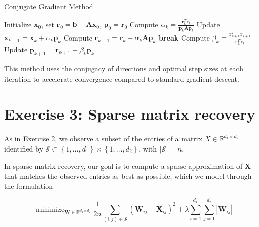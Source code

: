 \documentclass[12pt]{article}
\begin{document}
    \begin{algorithm}
        \caption{Conjugate Gradient Method}
        \begin{algorithmic}[1]
            \State Initialize \(\boldsymbol{x}_0\), set \(\boldsymbol{r}_0 = \boldsymbol{b} - \boldsymbol{A} \boldsymbol{x}_0\), \(\boldsymbol{p}_0 = \boldsymbol{r}_0\)
                \State Compute \(\alpha_k = \frac{\boldsymbol{r}_k^T \boldsymbol{r}_k}{\boldsymbol{p}_k^T \boldsymbol{A} \boldsymbol{p}_k}\)
                \State Update \(\boldsymbol{x}_{k+1} = \boldsymbol{x}_k + \alpha_k \boldsymbol{p}_k\)
                \State Compute \(\boldsymbol{r}_{k+1} = \boldsymbol{r}_k - \alpha_k \boldsymbol{A} \boldsymbol{p}_k\)
                    \State \textbf{break}
                \EndIf
                \State Compute \(\beta_k = \frac{\boldsymbol{r}_{k+1}^T \boldsymbol{r}_{k+1}}{\boldsymbol{r}_k^T \boldsymbol{r}_k}\)
                \State Update \(\boldsymbol{p}_{k+1} = \boldsymbol{r}_{k+1} + \beta_k \boldsymbol{p}_k\)
            \EndFor
        \end{algorithmic}
    \end{algorithm}

    This method uses the conjugacy of directions and optimal step sizes at each iteration to accelerate convergence compared to standard gradient descent.

    \section*{Exercise 3: Sparse matrix recovery}
    As in Exercise 2, we observe a subset of the entries of a matrix $X \in \mathbb{R}^{d_{1} \times d_{2}}$ identified by $\mathcal{S} \subset\left\{1, \ldots, d_{1}\right\} \times\left\{1, \ldots, d_{2}\right\}$, with $|\mathcal{S}|=n$.

    In sparse matrix recovery, our goal is to compute a sparse approximation of $\boldsymbol{X}$ that matches the observed entries as best as possible, which we model through the formulation

    \begin{equation}
        \operatorname{minimize}_{\boldsymbol{W} \in \mathbb{R}^{d_{1} \times d_{2}}} \frac{1}{2 n} \sum_{(i, j) \in \mathcal{S}}\left(\boldsymbol{W}_{i j}-\boldsymbol{X}_{i j}\right)^{2}+\lambda \sum_{i=1}^{d_{1}} \sum_{j=1}^{d_{2}}\left|\boldsymbol{W}_{i j}\right|
    \end{equation}
\end{document}
